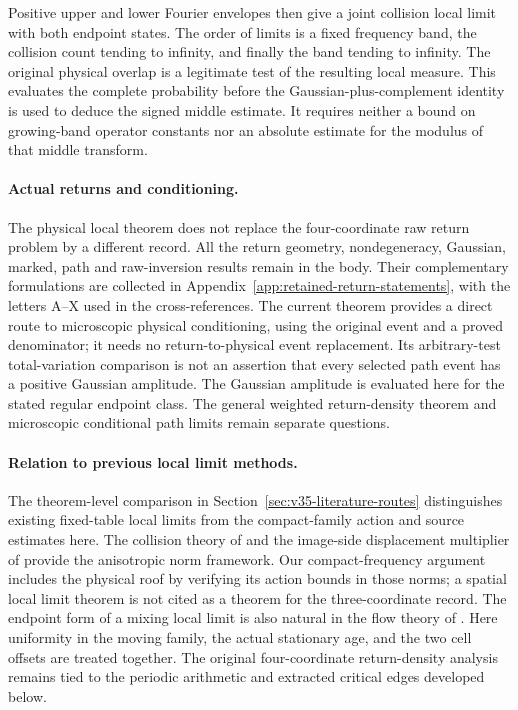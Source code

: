 \documentclass[11pt,reqno]{amsart}
\numberwithin{equation}{section}
\theoremstyle{definition}\newtheorem{definition}[theorem]{Definition}
\theoremstyle{remark}\newtheorem{remark}[theorem]{Remark}
\begin{document}
Positive upper and lower Fourier envelopes then give a joint collision
local limit with both endpoint states. The order of limits is a fixed
frequency band, the collision count tending to infinity, and finally
the band tending to infinity. The original physical overlap is a
legitimate test of the resulting local measure. This evaluates the
complete probability before the Gaussian-plus-complement identity is
used to deduce the signed middle estimate. It requires neither a bound
on growing-band operator constants nor an absolute estimate for the
modulus of that middle transform.

\paragraph{Actual returns and conditioning.}
The physical local theorem does not replace the four-coordinate raw
return problem by a different record. All the return geometry,
nondegeneracy, Gaussian, marked, path and raw-inversion results remain
in the body. Their complementary formulations are collected in
Appendix~\ref{app:retained-return-statements}, with the letters A--X
used in the cross-references. The current theorem provides a direct
route to microscopic physical conditioning, using the original event
and a proved denominator; it needs no return-to-physical event
replacement. Its arbitrary-test total-variation comparison is not an
assertion that every selected path event has a positive Gaussian
amplitude. The Gaussian amplitude is evaluated here for the stated
regular endpoint class. The general weighted return-density theorem
and microscopic conditional path limits remain separate questions.

\paragraph{Relation to previous local limit methods.}
The theorem-level comparison in Section~\ref{sec:v35-literature-routes} distinguishes existing fixed-table local limits from the compact-family action and source estimates here. The collision theory of \cite{DZ11,DZ} and the image-side displacement
multiplier of \cite{DPZ} provide the anisotropic norm framework.
Our compact-frequency argument includes the physical roof by verifying
its action bounds in those norms; a spatial local limit theorem is not
cited as a theorem for the three-coordinate record. The endpoint form
of a mixing local limit is also natural in the flow theory of
\cite{DN}. Here uniformity in the moving family, the actual stationary
age, and the two cell offsets are treated together. The original
four-coordinate return-density analysis remains tied to the periodic
arithmetic and extracted critical edges developed below.
\end{document}
